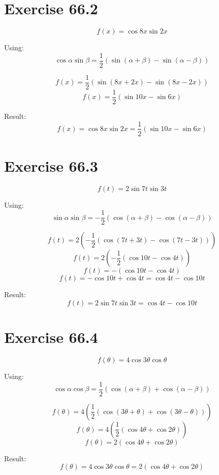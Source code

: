 \documentclass[a4paper, 10pt]{scrartcl}
\begin{document}
\section{Exercise 66.2}

\[f(x) = \cos{8x}\sin{2x}\]

Using:
\[\cos{\alpha}\sin{\beta} = \frac{1}{2}(\sin{(\alpha + \beta)} - \sin{(\alpha - \beta)})\]

\[f(x) = \frac{1}{2}(\sin{(8x + 2x)} - \sin{(8x - 2x)})\]
\[f(x) = \frac{1}{2}(\sin{10x} - \sin{6x})\]

Result:
\[f(x) = \cos{8x}\sin{2x} = \frac{1}{2}(\sin{10x} - \sin{6x})\]

\section{Exercise 66.3}

\[f(t) = 2\sin{7t}\sin{3t}\]

Using:
\[\sin{\alpha}\sin{\beta} = -\frac{1}{2}(\cos{(\alpha + \beta)} - \cos{(\alpha - \beta)})\]

\[f(t) = 2\left(-\frac{1}{2}(\cos{(7t + 3t)} - \cos{(7t - 3t)})\right)\]
\[f(t) = 2\left(-\frac{1}{2}(\cos{10t} - \cos{4t})\right)\]
\[f(t) = -(\cos{10t} - \cos{4t})\]
\[f(t) = -\cos{10t} + \cos{4t} = \cos{4t} - \cos{10t}\]

Result:
\[f(t) = 2\sin{7t}\sin{3t} = \cos{4t} - \cos{10t}\]

\section{Exercise 66.4}

\[f(\theta) = 4\cos{3\theta}\cos{\theta}\]

Using:
\[\cos{\alpha}\cos{\beta} = \frac{1}{2}(\cos{(\alpha + \beta)} + \cos{(\alpha - \beta)})\]

\[f(\theta) = 4\left(\frac{1}{2}(\cos{(3\theta + \theta)} + \cos{(3\theta - \theta)})\right)\]
\[f(\theta) = 4\left(\frac{1}{2}(\cos{4\theta} + \cos{2\theta})\right)\]
\[f(\theta) = 2(\cos{4\theta} + \cos{2\theta})\]

Result:
\[f(\theta) = 4\cos{3\theta}\cos{\theta} = 2(\cos{4\theta} + \cos{2\theta})\]
\end{document}
